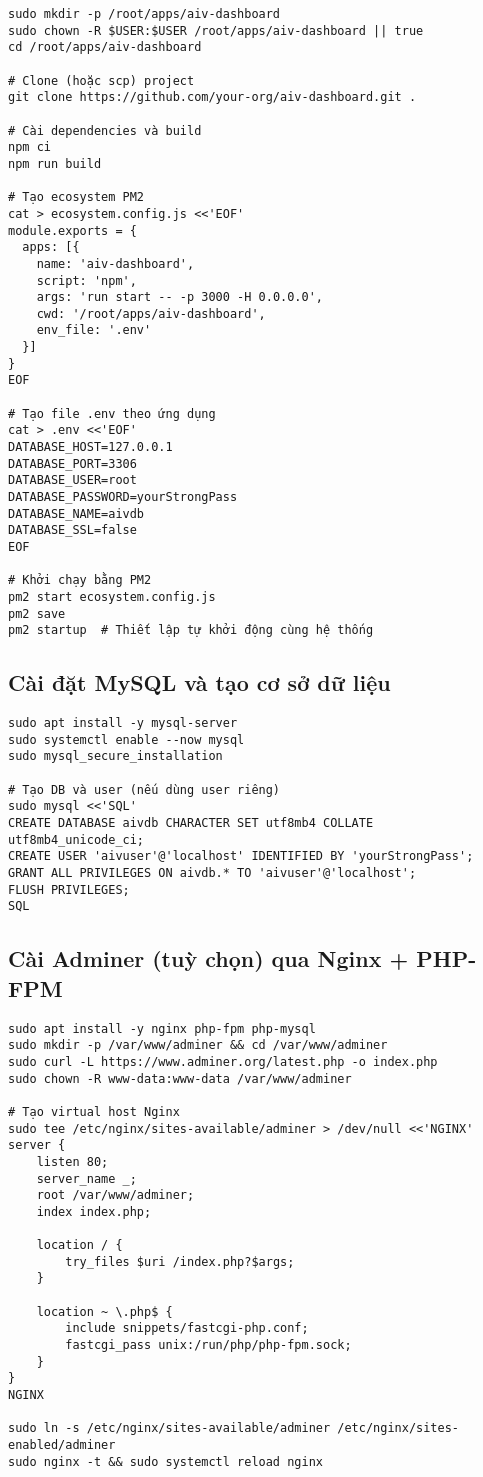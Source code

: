 \documentclass[12pt,a4paper]{article}
\begin{document}
\begin{lstlisting}[caption=Clone mã nguồn và chạy bằng PM2]
sudo mkdir -p /root/apps/aiv-dashboard
sudo chown -R $USER:$USER /root/apps/aiv-dashboard || true
cd /root/apps/aiv-dashboard

# Clone (hoặc scp) project
git clone https://github.com/your-org/aiv-dashboard.git .

# Cài dependencies và build
npm ci
npm run build

# Tạo ecosystem PM2
cat > ecosystem.config.js <<'EOF'
module.exports = {
  apps: [{
    name: 'aiv-dashboard',
    script: 'npm',
    args: 'run start -- -p 3000 -H 0.0.0.0',
    cwd: '/root/apps/aiv-dashboard',
    env_file: '.env'
  }]
}
EOF

# Tạo file .env theo ứng dụng
cat > .env <<'EOF'
DATABASE_HOST=127.0.0.1
DATABASE_PORT=3306
DATABASE_USER=root
DATABASE_PASSWORD=yourStrongPass
DATABASE_NAME=aivdb
DATABASE_SSL=false
EOF

# Khởi chạy bằng PM2
pm2 start ecosystem.config.js
pm2 save
pm2 startup  # Thiết lập tự khởi động cùng hệ thống
\end{lstlisting}

\subsection{Cài đặt MySQL và tạo cơ sở dữ liệu}

\begin{lstlisting}[caption=Cài MySQL và khởi tạo database]
sudo apt install -y mysql-server
sudo systemctl enable --now mysql
sudo mysql_secure_installation

# Tạo DB và user (nếu dùng user riêng)
sudo mysql <<'SQL'
CREATE DATABASE aivdb CHARACTER SET utf8mb4 COLLATE utf8mb4_unicode_ci;
CREATE USER 'aivuser'@'localhost' IDENTIFIED BY 'yourStrongPass';
GRANT ALL PRIVILEGES ON aivdb.* TO 'aivuser'@'localhost';
FLUSH PRIVILEGES;
SQL
\end{lstlisting}

\subsection{Cài Adminer (tuỳ chọn) qua Nginx + PHP-FPM}

\begin{lstlisting}[caption=Cài Nginx, PHP-FPM và Adminer]
sudo apt install -y nginx php-fpm php-mysql
sudo mkdir -p /var/www/adminer && cd /var/www/adminer
sudo curl -L https://www.adminer.org/latest.php -o index.php
sudo chown -R www-data:www-data /var/www/adminer

# Tạo virtual host Nginx
sudo tee /etc/nginx/sites-available/adminer > /dev/null <<'NGINX'
server {
    listen 80;
    server_name _;
    root /var/www/adminer;
    index index.php;

    location / {
        try_files $uri /index.php?$args;
    }

    location ~ \.php$ {
        include snippets/fastcgi-php.conf;
        fastcgi_pass unix:/run/php/php-fpm.sock;
    }
}
NGINX

sudo ln -s /etc/nginx/sites-available/adminer /etc/nginx/sites-enabled/adminer
sudo nginx -t && sudo systemctl reload nginx
\end{lstlisting}
\end{document}
